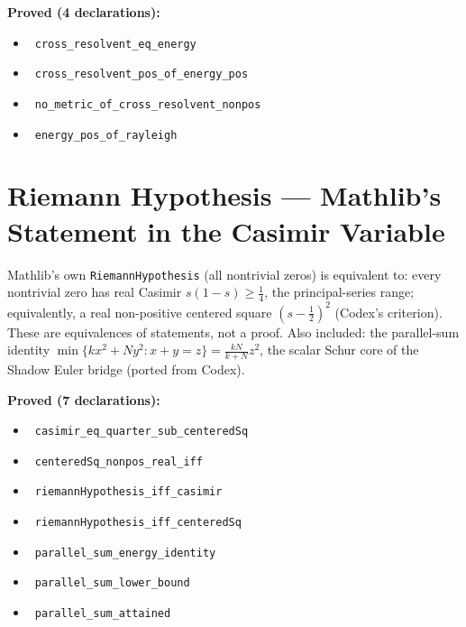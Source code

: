 \documentclass{report}
\theoremstyle{definition}
\begin{document}
\noindent\textbf{Proved (4 declarations):}
\begin{itemize}
  \item {}\leanok\ \texttt{cross\_resolvent\_eq\_energy}
  \item {}\leanok\ \texttt{cross\_resolvent\_pos\_of\_energy\_pos}
  \item {}\leanok\ \texttt{no\_metric\_of\_cross\_resolvent\_nonpos}
  \item {}\leanok\ \texttt{energy\_pos\_of\_rayleigh}
\end{itemize}

\section{Riemann Hypothesis --- Mathlib's Statement in the Casimir Variable}
Mathlib's own \texttt{RiemannHypothesis} (all nontrivial zeros) is equivalent to: every nontrivial zero has real Casimir $s(1-s)\ge\tfrac14$, the principal-series range; equivalently, a real non-positive centered square $(s-\tfrac12)^2$ (Codex's criterion). These are equivalences of statements, not a proof. Also included: the parallel-sum identity $\min\{kx^2+Ny^2: x+y=z\}=\frac{kN}{k+N}z^2$, the scalar Schur core of the Shadow Euler bridge (ported from Codex).

\noindent\textbf{Proved (7 declarations):}
\begin{itemize}
  \item {}\leanok\ \texttt{casimir\_eq\_quarter\_sub\_centeredSq}
  \item {}\leanok\ \texttt{centeredSq\_nonpos\_real\_iff}
  \item {}\leanok\ \texttt{riemannHypothesis\_iff\_casimir}
  \item {}\leanok\ \texttt{riemannHypothesis\_iff\_centeredSq}
  \item {}\leanok\ \texttt{parallel\_sum\_energy\_identity}
  \item {}\leanok\ \texttt{parallel\_sum\_lower\_bound}
  \item {}\leanok\ \texttt{parallel\_sum\_attained}
\end{itemize}
\end{document}
